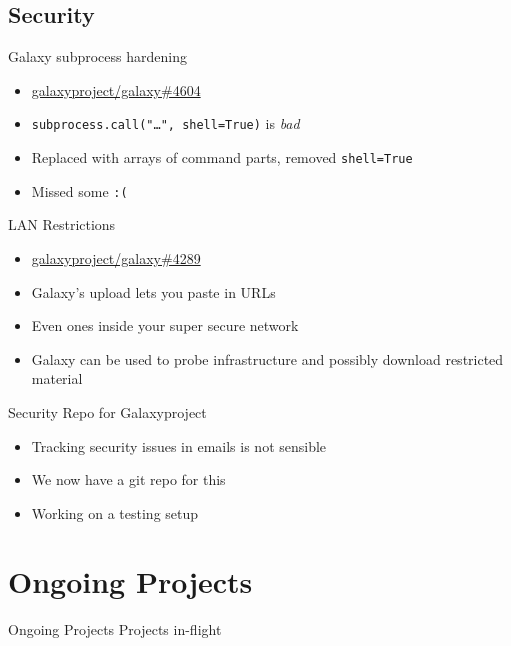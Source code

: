 \documentclass[12pt]{ufrslides}
\begin{document}
\subsection{Security}

	\begin{frame}{Galaxy subprocess hardening}
		\begin{itemize}
			\item \href{https://github.com/galaxyproject/galaxy/pull/4604}{galaxyproject/galaxy\#4604}
			\item \texttt{subprocess.call("\ldots{}", shell=True)} is \emph{bad}
			\item Replaced with arrays of command parts, removed \texttt{shell=True}
			\item Missed some \texttt{:(}
		\end{itemize}
	\end{frame}

	\begin{frame}{LAN Restrictions}
		\begin{itemize}
			\item \href{https://github.com/galaxyproject/galaxy/pull/4289}{galaxyproject/galaxy\#4289}
			\item Galaxy's upload lets you paste in URLs
			\item Even ones inside your super secure network
			\item Galaxy can be used to probe infrastructure and possibly download restricted material
		\end{itemize}
	\end{frame}

	\begin{frame}{Security Repo for Galaxyproject}
		\begin{itemize}
			\item Tracking security issues in emails is not sensible
			\item We now have a git repo for this
			\item Working on a testing setup
		\end{itemize}
	\end{frame}


\section[Ongoing]{Ongoing Projects}
\begin{frame}{Ongoing Projects}
	Projects in-flight
\end{frame}
\end{document}
